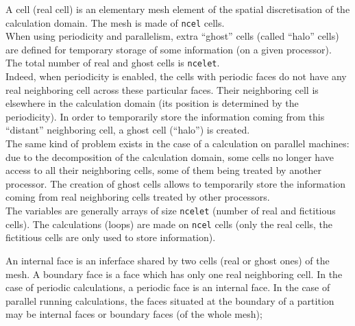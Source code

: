 {{{


A cell (real cell) is an elementary mesh element of the spatial
discretisation of the calculation domain. The mesh is made of \texttt{ncel} cells.\\
When using periodicity and parallelism, extra ``ghost'' cells
(called ``halo'' cells) are defined for temporary storage of some information
(on a given processor).
The total number of real and ghost cells is \texttt{ncelet}. \\
\hspace*{1cm} Indeed, when periodicity is enabled, the cells with
periodic faces do not have any real neighboring cell across these
particular faces. Their neighboring cell is elsewhere in the calculation
domain (its position is determined by the periodicity). In order to
temporarily store the information coming from this ``distant''
neighboring cell, a ghost cell (``halo'') is created. \\
\hspace*{1cm} The same kind of problem exists in the case of a
calculation on parallel machines: due to the decomposition of the
calculation domain, some cells no longer have access to all
their neighboring cells, some of them being treated by another processor. The
creation of ghost cells allows to temporarily store the information
coming from real neighboring cells treated by other processors.\\
The variables are generally arrays of size \texttt{ncelet} (number of real and
fictitious cells). The calculations (loops) are made on \texttt{ncel} cells (only
the real cells, the fictitious cells are only used to store information).

An internal face is an inferface shared by two cells (real or ghost
ones) of the mesh. A boundary face is a face which has only one real
neighboring cell. In the case of periodic calculations, a periodic face
is an internal face. In the case of parallel running calculations, the
faces situated at the boundary of a partition may be internal faces or
boundary faces (of the whole mesh);

}}}
